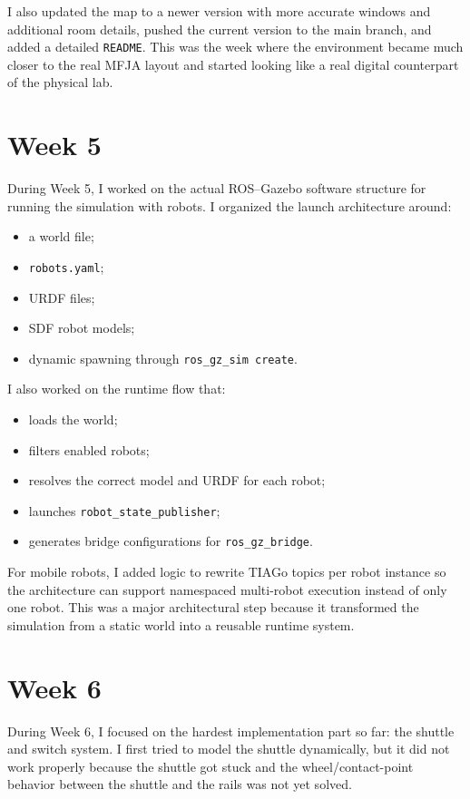 \documentclass[11pt,a4paper]{article}
\begin{document}
I also updated the map to a newer version with more accurate windows and
additional room details, pushed the current version to the main branch, and
added a detailed \texttt{README}. This was the week where the environment
became much closer to the real MFJA layout and started looking like a real
digital counterpart of the physical lab.

\section*{Week 5}

During Week 5, I worked on the actual ROS--Gazebo software structure for
running the simulation with robots. I organized the launch architecture around:

\begin{itemize}
\item a world file;
\item \texttt{robots.yaml};
\item URDF files;
\item SDF robot models;
\item dynamic spawning through \texttt{ros\_gz\_sim create}.
\end{itemize}

I also worked on the runtime flow that:

\begin{itemize}
\item loads the world;
\item filters enabled robots;
\item resolves the correct model and URDF for each robot;
\item launches \texttt{robot\_state\_publisher};
\item generates bridge configurations for \texttt{ros\_gz\_bridge}.
\end{itemize}

For mobile robots, I added logic to rewrite TIAGo topics per robot instance so
the architecture can support namespaced multi-robot execution instead of only
one robot. This was a major architectural step because it transformed the
simulation from a static world into a reusable runtime system.

\section*{Week 6}

During Week 6, I focused on the hardest implementation part so far: the shuttle
and switch system. I first tried to model the shuttle dynamically, but it did
not work properly because the shuttle got stuck and the wheel/contact-point
behavior between the shuttle and the rails was not yet solved.
\end{document}

